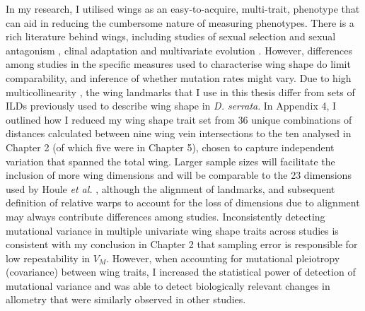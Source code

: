 In my research, I utilised wings as an easy-to-acquire, multi-trait, phenotype that can aid in reducing the cumbersome nature of measuring phenotypes. There is a rich literature behind wings, including studies of sexual selection \citep{McGu11a, Carr11} and sexual antagonism \citep{Szte19}, clinal adaptation \citep{Hoff02} and multivariate evolution \citep{Houl17}. However, differences among studies in the specific measures used to characterise wing shape do limit comparability, and inference of whether mutation rates might vary. Due to high multicollinearity \citep{McGu15,Szte15, Duga21}, the wing landmarks that I use in this thesis differ from sets of ILDs previously used to describe wing shape in \textit{D. serrata}\citep{McGu15,Szte15, Duga21,McGu13}. In Appendix 4, I outlined how I reduced my wing shape trait set from 36 unique combinations of distances calculated between nine wing vein intersections to the ten analysed in Chapter 2 (of which five were in Chapter 5), chosen to capture independent variation that spanned the total wing. Larger sample sizes will facilitate the inclusion of more wing dimensions and will be comparable to the 23 dimensions used by Houle \textit{et al.} \citeyear{Houl13,Houl17}, although the alignment of landmarks, and subsequent definition of relative warps to account for the loss of dimensions due to alignment may always contribute differences among studies. Inconsistently detecting mutational variance in multiple univariate wing shape traits across studies is consistent with my conclusion in Chapter 2 that sampling error is responsible for low repeatability in $V_M$. However, when accounting for mutational pleiotropy (covariance) between wing traits, I increased the statistical power of detection of mutational variance and was able to detect biologically relevant changes in allometry that were similarly observed in other studies. \par

